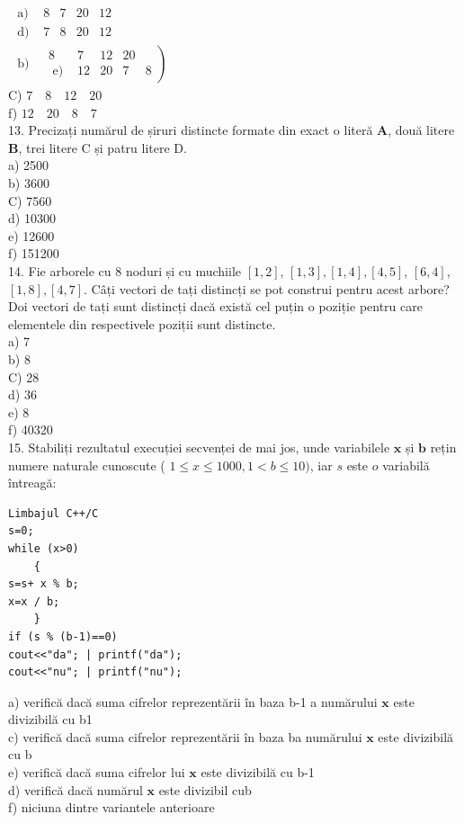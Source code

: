 \documentclass[10pt]{article}
\begin{document}
$\begin{array}{lllll}\text { a) } & 8 & 7 & 20 & 12 \\ \text { d) } & 7 & 8 & 20 & 12\end{array}$\\
$\begin{array}{lllll}\text { b) } & \left.\begin{array}{lllll}8 & 7 & 12 & 20 \\ \text { e) } & 12 & 20 & 7 & 8\end{array}\right)\end{array}$\\
C) $7 \quad 8 \quad 12 \quad 20$\\
f) $12 \quad 20 \quad 8 \quad 7$\\
13. Precizați numărul de șiruri distincte formate din exact o literă $\mathbf{A}$, două litere $\mathbf{B}$, trei litere C și patru litere D.\\
a) 2500\\
b) 3600\\
C) 7560\\
d) 10300\\
e) 12600\\
f) 151200\\
14. Fie arborele cu 8 noduri și cu muchiile $[1,2]$, $[1,3],[1,4],[4,5]$, $[6,4]$, $[1,8],[4,7]$. Câți vectori de tați distincți se pot construi pentru acest arbore? Doi vectori de tați sunt distincți dacă există cel puțin o poziție pentru care elementele din respectivele poziții sunt distincte.\\
a) 7\\
b) 8\\
C) 28\\
d) 36\\
e) 8\\
f) 40320\\
15. Stabiliți rezultatul execuției secvenței de mai jos, unde variabilele $\mathbf{x}$ și $\mathbf{b}$ rețin numere naturale cunoscute ( $1 \leq x \leq 1000,1<b \leq 10)$, iar $s$ este $o$ variabilă întreagă:

\begin{verbatim}
Limbajul C++/C
s=0;
while (x>0)
    {
s=s+ x % b;
x=x / b;
    }
if (s % (b-1)==0)
cout<<"da"; | printf("da");
cout<<"nu"; | printf("nu");
\end{verbatim}

a) verifică dacă suma cifrelor reprezentării în baza b-1 a numărului $\mathbf{x}$ este divizibilă cu b1\\
c) verifică dacă suma cifrelor reprezentării în baza ba numărului $\mathbf{x}$ este divizibilă cu b\\
e) verifică dacă suma cifrelor lui $\mathbf{x}$ este divizibilă cu b-1\\
d) verifică dacă numărul $\mathbf{x}$ este divizibil cub\\
f) niciuna dintre variantele anterioare
\end{document}
